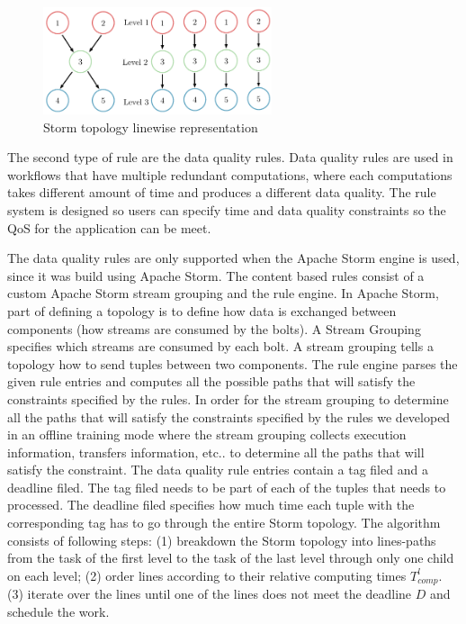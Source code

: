 \begin{figure}[h!]
  \centering
  \includegraphics[width=0.6\textwidth]{Figures/AlgoImg.pdf}
  \caption{Storm topology linewise representation}
  \label{fig:AlgoImg}
\end{figure}

The second type of rule are the data quality rules. Data quality rules are used in workflows that have multiple redundant computations, where each computations takes different amount of time and produces a different data quality. The rule system is designed so users can specify time and data quality constraints so the QoS for the application can be meet.

The data quality rules are only supported when the Apache Storm engine is used, since it was build using Apache Storm. The content based rules consist of a custom Apache Storm stream grouping and the rule engine. In Apache Storm, part of defining a topology is to define how data is exchanged between components (how streams are consumed by the bolts). A Stream Grouping specifies which streams are consumed by each bolt. A stream grouping tells a topology how to send tuples between two components. The rule engine parses the given rule entries and computes all the possible paths that will satisfy the constraints specified by the rules. In order for the stream grouping to determine all the paths that will satisfy the constraints specified by the rules we developed in an offline training mode where the stream grouping collects execution information, transfers information, etc.. to determine all the paths that will satisfy the constraint. The data quality rule entries contain a tag filed and a deadline filed. The tag filed needs to be part of each of the tuples that needs to processed. The deadline filed specifies how much time each tuple with the corresponding tag has to go through the entire Storm topology. The algorithm consists of following steps: (1) breakdown the Storm topology into lines-paths from the task of the first level to the task of the last level through only one child on each level; (2) order lines according to their relative computing times $T_{comp}^l$. (3) iterate over the lines until one of the lines does not meet the deadline $D$ and schedule the work.

